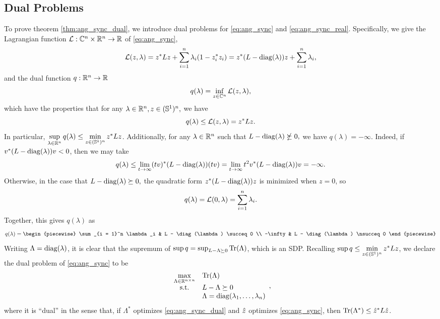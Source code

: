 \subsection{Dual Problems}
To prove theorem \ref{thm:ang_sync_dual}, we introduce dual problems for \eqref{eq:ang_sync} and \eqref{eq:ang_sync_real}.  Specifically, we give the Lagrangian function $\mathcal{L} : \mathbb{C}^n \times \mathbb{R}^n \to \mathbb{R}$ of \eqref{eq:ang_sync}, \[\mathcal{L}(z, \lambda) = z^* L z + \sum_{i = 1}^n \lambda_i (1 - z_i^* z_i) = z^*(L - \operatorname{diag}(\lambda)) z + \sum_{i = 1}^n \lambda_i,\] and the dual function $q : \mathbb{R}^n \to \mathbb{R}$ \[q(\lambda) = \inf_{z \in \mathbb{C}^n} \mathcal{L}(z, \lambda),\] which have the properties that for any $\lambda \in \mathbb{R}^n, z \in (\mathbb{S}^1)^n,$ we have \[q(\lambda) \le \mathcal{L}(z, \lambda) = z^* L z.\]  In particular, $\sup\limits_{\lambda \in \mathbb{R}^n} q(\lambda) \le \min\limits_{z \in (\mathbb{S}^1)^n} z^* L z$.  Additionally, for any $\lambda \in \mathbb{R}^n$ such that $L - \operatorname{diag}(\lambda) \nsucceq 0,$ we have $q(\lambda) = - \infty$.  Indeed, if $v^*(L - \operatorname{diag}(\lambda))v < 0$, then we may take \[q(\lambda) \le \lim_{t \to \infty} (tv)^* (L - \operatorname{diag}(\lambda)) (tv) = \lim_{t \to \infty} t^2 v^*  (L - \operatorname{diag}(\lambda)) v = -\infty.\]  Otherwise, in the case that $L - \operatorname{diag}(\lambda) \succeq 0,$ the quadratic form $z^* (L - \operatorname{diag}(\lambda)) z$ is minimized when $z = 0$, so \[q(\lambda) = \mathcal{L}(0, \lambda) = \sum_{i = 1}^n \lambda_i.\]  Together, this gives $q(\lambda)$ as \[q(\lambda) = \begin{piecewise} \sum_{i = 1}^n \lambda_i & L - \diag(\lambda) \succeq 0 \\ -\infty & L - \diag(\lambda) \nsucceq 0 \end{piecewise}\]  Writing $\Lambda = \operatorname{diag}(\lambda)$, it is clear that the supremum of $\sup q = \sup_{L - \Lambda \succeq 0} \operatorname{Tr}(\Lambda)$, which is an SDP.  Recalling $\sup q \le \min\limits_{z \in (\mathbb{S}^1)^n} z^* L z$, we declare the dual problem of \eqref{eq:ang_sync} to be
\begin{equation}
  \begin{array}{cl} \max\limits_{\Lambda \in \mathbb{R}^{n \times n}} & \operatorname{Tr}(\Lambda) \\
    \text{s.t.} & L - \Lambda \succeq 0 \\
    & \Lambda = \operatorname{diag}(\lambda_1, \ldots, \lambda_n)
  \end{array}, \label{eq:ang_sync_dual}
\end{equation}
where it is ``dual'' in the sense that, if $\Lambda^*$ optimizes \eqref{eq:ang_sync_dual} and $\hat{z}$ optimizes \eqref{eq:ang_sync}, then $\operatorname{Tr}(\Lambda^*) \le \hat{z}^* L \hat{z}$.  

